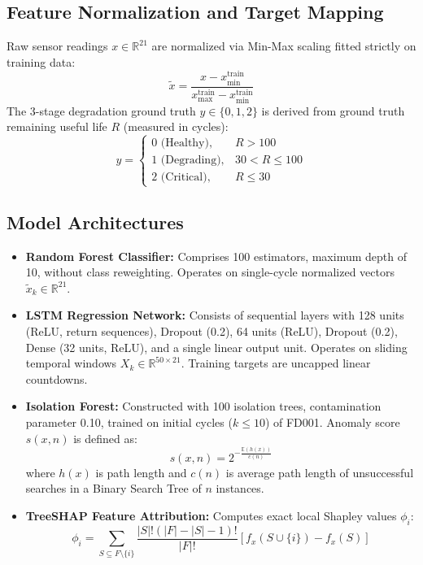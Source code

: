 \documentclass[conference]{IEEEtran}
\begin{document}
\subsection{Feature Normalization and Target Mapping}
Raw sensor readings $x \in \mathbb{R}^{21}$ are normalized via Min-Max scaling fitted strictly on training data:
\begin{equation}
\tilde{x} = \frac{x - x_{\min}^{\text{train}}}{x_{\max}^{\text{train}} - x_{\min}^{\text{train}}}
\label{eq:minmax}
\end{equation}
The 3-stage degradation ground truth $y \in \{0, 1, 2\}$ is derived from ground truth remaining useful life $R$ (measured in cycles):
\begin{equation}
y = \begin{cases}
0 \text{ (Healthy)}, & R > 100 \\
1 \text{ (Degrading)}, & 30 < R \le 100 \\
2 \text{ (Critical)}, & R \le 30
\end{cases}
\label{eq:stagemap}
\end{equation}

\subsection{Model Architectures}
\begin{itemize}
    \item \textbf{Random Forest Classifier:} Comprises 100 estimators, maximum depth of 10, without class reweighting. Operates on single-cycle normalized vectors $\tilde{x}_k \in \mathbb{R}^{21}$.
    \item \textbf{LSTM Regression Network:} Consists of sequential layers with 128 units (ReLU, return sequences), Dropout (0.2), 64 units (ReLU), Dropout (0.2), Dense (32 units, ReLU), and a single linear output unit. Operates on sliding temporal windows $X_k \in \mathbb{R}^{50 \times 21}$. Training targets are uncapped linear countdowns.
    \item \textbf{Isolation Forest:} Constructed with 100 isolation trees, contamination parameter 0.10, trained on initial cycles ($k \le 10$) of FD001. Anomaly score $s(x, n)$ is defined as:
    \begin{equation}
    s(x, n) = 2^{-\frac{\mathbb{E}(h(x))}{c(n)}}
    \label{eq:iforest}
    \end{equation}
    where $h(x)$ is path length and $c(n)$ is average path length of unsuccessful searches in a Binary Search Tree of $n$ instances.
    \item \textbf{TreeSHAP Feature Attribution:} Computes exact local Shapley values $\phi_i$:
    \begin{equation}
    \phi_i = \sum_{S \subseteq F \setminus \{i\}} \frac{|S|!(|F| - |S| - 1)!}{|F|!} [f_x(S \cup \{i\}) - f_x(S)]
    \label{eq:shap}
    \end{equation}
\end{itemize}
\end{document}
